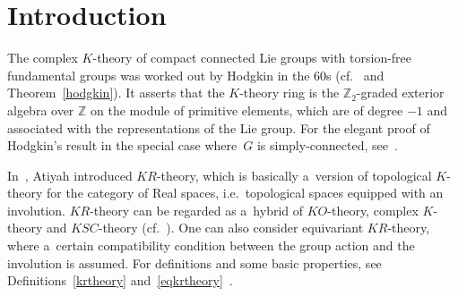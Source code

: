 \documentclass[pdftex]{sigma}
\numberwithin{equation}{section}
\begin{document}
\allowdisplaybreaks

\renewcommand{\PaperNumber}{022}

\FirstPageHeading










\vspace{-2mm}

\section{Introduction}
The complex $K$-theory of compact connected Lie groups with torsion-free fundamental groups was worked out by Hodgkin in
the 60s (cf.~\cite{Ho} and Theorem~\ref{hodgkin}).
It asserts that the $K$-theory ring is the $\mathbb{Z}_2$-graded exterior algebra over $\mathbb{Z}$ on the module of
primitive elements, which are of degree $-1$ and associated with the representations of the Lie group.
For the elegant proof of Hodgkin's result in the special case where~$G$ is simply-connected, see~\cite{At2}.

In~\cite{At3}, Atiyah introduced $KR$-theory, which is basically a~version of topological $K$-theory for the category of
Real spaces, i.e.\ topological spaces equipped with an involution.
$KR$-theory can be regarded as a~hybrid of $KO$-theory, complex $K$-theory and $KSC$-theory (cf.~\cite{At3}).
One can also consider equivariant $KR$-theory, where a~certain compatibility condition between the group action and the
involution is assumed.
For def\/initions and some basic properties, see Def\/initions~\ref{krtheory} and~\ref{eqkrtheory}~\cite{At3, AS}.
\end{document}
